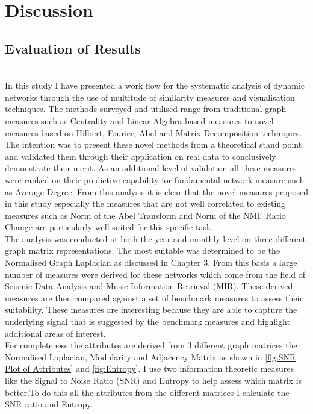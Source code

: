\chapter{Discussion}
\section{Evaluation of Results}
\\
In this study I have presented a work flow for the systematic analysis of dynamic networks through the use of multitude of similarity measures and visualisation techniques. The methods surveyed and utilised range from traditional graph measures such as Centrality and Linear Algebra based measures to novel measures based on Hilbert, Fourier, Abel and Matrix Decomposition techniques. The intention was to present these novel methods from a theoretical stand point and validated them through their application on real data to conclusively demonstrate their merit. As an additional level of validation all these measures were ranked on their predictive capability for fundamental network measure such as Average Degree. From this analysis it is clear that the novel measures proposed in this study especially the measures that are not well correlated to existing measures such as Norm of the Abel Transform and Norm of the NMF Ratio Change are particularly well suited for this specific task. \\

The analysis was conducted at both the year and monthly level on three different graph matrix representations. The most suitable was determined to be the Normalised Graph Laplacian as discussed in Chapter 3. From this basis a large number of measures were derived for these networks which come from the field of Seismic Data Analysis and Music Information Retrieval (MIR). These derived measures are then compared against a set of benchmark measures to assess their suitability. These measures are interesting because they are able to capture the underlying signal that is suggested by the benchmark measures and highlight additional areas of interest. \\

For completeness the attributes are derived from 3 different graph matrices the Normalised Laplacian, Modularity and Adjacency Matrix as shown in \ref{fig:SNR Plot of Attributes} and \ref{fig:Entropy}. I use two information theoretic measures like the Signal to Noise Ratio (SNR) and Entropy to help assess which matrix is better.To do this all the attributes from the different matrices I calculate the SNR ratio and Entropy. 

